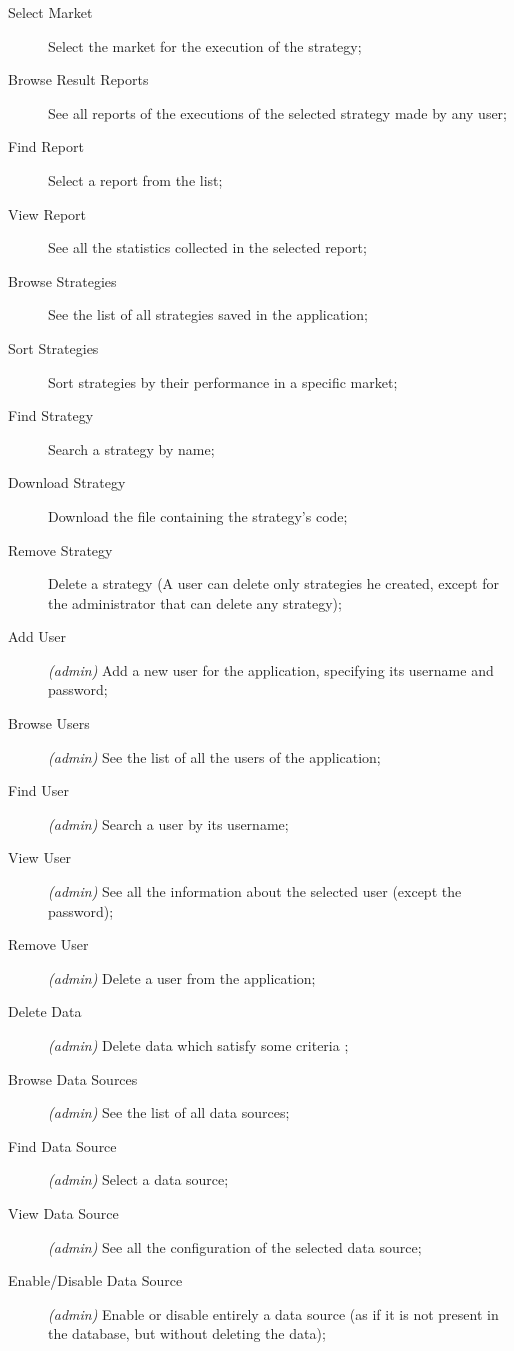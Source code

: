 \begin{description}
	\item[Select Market] Select the market for the execution of the
		strategy;
	\item[Browse Result Reports] See all reports of the executions of the
		selected strategy made by any user;
	\item[Find Report] Select a report from the list;
	\item[View Report] See all the statistics collected in the selected
		report;
	\item[Browse Strategies] See the list of all strategies saved in the
		application;
	\item[Sort Strategies] Sort strategies by their performance in a
		specific market;
	\item[Find Strategy] Search a strategy by name;
	\item[Download Strategy] Download the file containing the strategy's
		code;
	\item[Remove Strategy] Delete a strategy (A user can delete only
		strategies he created, except for the administrator that can
		delete any strategy);
	\item[Add User] \textit{(admin)} Add a new user for the application,
		specifying its username and password;
	\item[Browse Users] \textit{(admin)} See the list of all the users of
		the application;
	\item[Find User] \textit{(admin)} Search a user by its username;
	\item[View User] \textit{(admin)} See all the information about the
		selected user (except the password);
	\item[Remove User] \textit{(admin)} Delete a user from the application;
	\item[Delete Data] \textit{(admin)} Delete data which satisfy some
		criteria ;
	\item[Browse Data Sources] \textit{(admin)} See the list of all data
		sources;
	\item[Find Data Source] \textit{(admin)} Select a data source;
	\item[View Data Source] \textit{(admin)} See all the configuration of
		the selected data source;
	\item[Enable/Disable Data Source] \textit{(admin)} Enable or disable
		entirely a data source (as if it is not present in the database,
		but without deleting the data);
\end{description}

